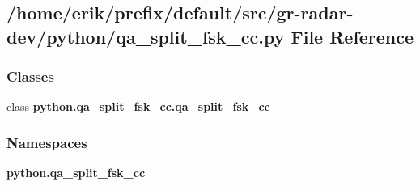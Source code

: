 \subsection{/home/erik/prefix/default/src/gr-\/radar-\/dev/python/qa\+\_\+split\+\_\+fsk\+\_\+cc.py File Reference}
\label{qa__split__fsk__cc_8py}
\subsubsection*{Classes}
\begin{DoxyCompactItemize}
\item 
class {\bf python.\+qa\+\_\+split\+\_\+fsk\+\_\+cc.\+qa\+\_\+split\+\_\+fsk\+\_\+cc}
\end{DoxyCompactItemize}
\subsubsection*{Namespaces}
\begin{DoxyCompactItemize}
\item 
 {\bf python.\+qa\+\_\+split\+\_\+fsk\+\_\+cc}
\end{DoxyCompactItemize}
